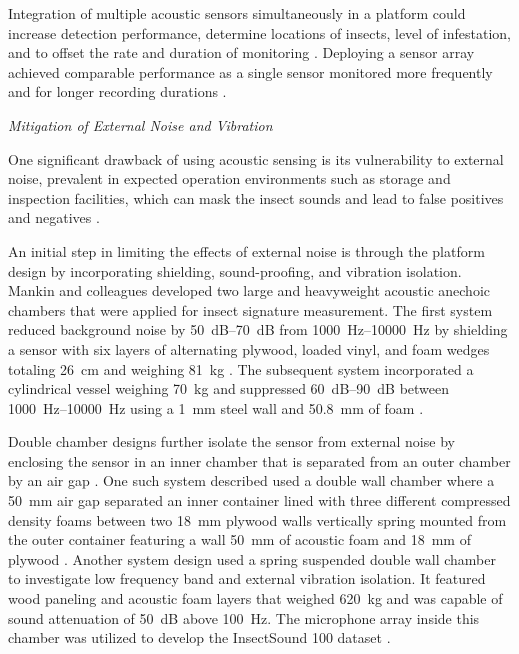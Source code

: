 \documentclass[../Vibro-Acoustic Signatures and Detection Algorithms for Stored Product Insects.tex]{subfiles}
\begin{document}
Integration of multiple acoustic sensors simultaneously in a platform could increase detection performance, determine locations of insects, level of infestation, and to 
offset the rate and duration of monitoring \cite{mankinPerspectivePromiseCentury2011}. Deploying a sensor array achieved comparable performance as a single sensor monitored more frequently and for longer recording durations \cite{hagstrumStoredProductProtection2012}.

\textit{Mitigation of External Noise and Vibration}

One significant drawback of using acoustic sensing is its vulnerability to external noise, prevalent in expected operation environments such as storage and inspection facilities, which can mask the insect sounds and lead to false positives and negatives \cite{mankinPerspectivePromiseCentury2011}.

An initial step in limiting the effects of external noise is through the platform design by incorporating shielding, sound-proofing, and vibration isolation. Mankin and colleagues developed two large and heavyweight acoustic anechoic chambers that were applied for insect signature measurement. The first system reduced background noise by \SIrange{50}{70}{\deci\bel} from \SIrange{1000}{10000}{\hertz} by shielding a sensor with six layers of alternating plywood, loaded vinyl, and foam wedges totaling \SI{26}{\centi\meter} and weighing \SI{81}{\kilo\gram} \cite{mankinNoiseShieldingAcoustic1996}. The subsequent system incorporated a cylindrical vessel weighing \SI{70}{\kilo\gram} and suppressed \SIrange{60}{90}{\deci\bel} between \SIrange{1000}{10000}{\hertz} using a \SI{1}{\milli\meter} steel wall and \SI{50.8}{\milli\meter} of foam \cite{mankinShieldingNoiseInterfering1997}.

Double chamber designs further isolate the sensor from external noise by enclosing the sensor in an inner chamber that is separated from an outer chamber by an air gap \cite{keerthanaAcousticDetectionCallosobruchus2025}. One such system described used a double wall chamber where a \SI{50}{\milli\meter} air gap separated an inner container lined with three different compressed density foams between two \SI{18}{\milli\meter} plywood walls vertically spring mounted from the outer container featuring a wall \SI{50}{\milli\meter} of acoustic foam and \SI{18}{\milli\meter} of plywood \cite{njorogeFrequencyTimePattern2016}. Another system design used a spring suspended double wall chamber to investigate low frequency band and external vibration isolation. It featured wood paneling and acoustic foam layers that weighed \SI{620}{\kilo\gram} and was capable of sound attenuation of \SI{50}{\deci\bel} above \SI{100}{\hertz}. The microphone array inside this chamber was utilized to develop the InsectSound 100 dataset \cite{brandingNoiseRobustAcoustic2023, brandingInsectSound1000InsectSound2024}.
\end{document}
